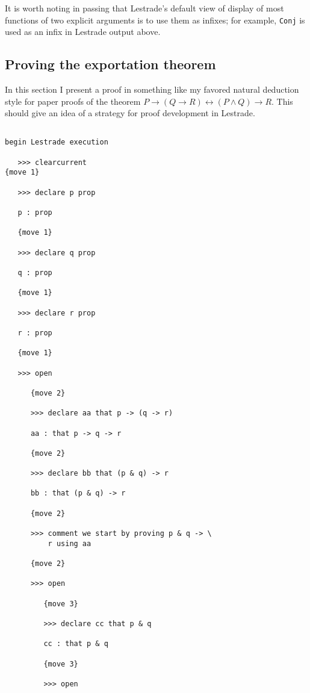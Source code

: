 \documentclass[12pt]{article}
\begin{document}
It is worth noting in passing that Lestrade's default view of display of most functions of two explicit arguments is to use them as infixes;  for example, {\tt Conj} is used as an infix in Lestrade output above.

\subsection{Proving the exportation theorem}

In this section I present a proof in something like my favored natural deduction style for paper proofs
of the theorem $P \rightarrow (Q \rightarrow R) \leftrightarrow (P \wedge Q) \rightarrow R$.  This should give
an idea of a strategy for proof development in Lestrade.

\begin{verbatim}

begin Lestrade execution

   >>> clearcurrent
{move 1}

   >>> declare p prop

   p : prop

   {move 1}

   >>> declare q prop

   q : prop

   {move 1}

   >>> declare r prop

   r : prop

   {move 1}

   >>> open

      {move 2}

      >>> declare aa that p -> (q -> r)

      aa : that p -> q -> r

      {move 2}

      >>> declare bb that (p & q) -> r

      bb : that (p & q) -> r

      {move 2}

      >>> comment we start by proving p & q -> \
          r using aa

      {move 2}

      >>> open

         {move 3}

         >>> declare cc that p & q

         cc : that p & q

         {move 3}

         >>> open


\end{verbatim}
\end{document}
